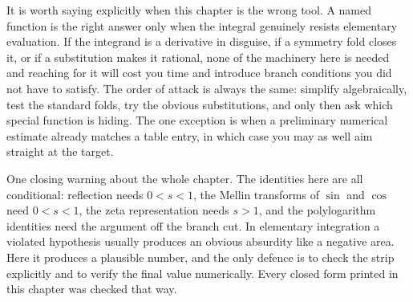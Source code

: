 It is worth saying explicitly when this chapter is the wrong tool. A named function is the right answer only when the integral genuinely resists elementary evaluation. If the integrand is a derivative in disguise, if a symmetry fold closes it, or if a substitution makes it rational, none of the machinery here is needed and reaching for it will cost you time and introduce branch conditions you did not have to satisfy. The order of attack is always the same: simplify algebraically, test the standard folds, try the obvious substitutions, and only then ask which special function is hiding. The one exception is when a preliminary numerical estimate already matches a table entry, in which case you may as well aim straight at the target.

One closing warning about the whole chapter. The identities here are all conditional: reflection needs $0<s<1$, the Mellin transforms of $\sin$ and $\cos$ need $0<s<1$, the zeta representation needs $s>1$, and the polylogarithm identities need the argument off the branch cut. In elementary integration a violated hypothesis usually produces an obvious absurdity like a negative area. Here it produces a plausible number, and the only defence is to check the strip explicitly and to verify the final value numerically. Every closed form printed in this chapter was checked that way.

